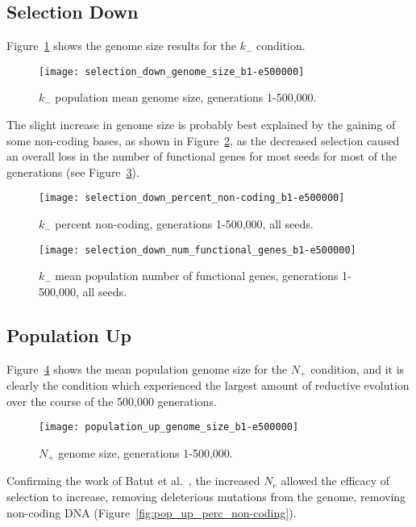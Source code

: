 \subsection{Selection Down}
Figure~\ref{fig:selection_down_genome_size} shows the genome size results for the $k_-$ condition. 
\begin{figure}[H]
	\centering
	\texttt{[image: selection\_down\_genome\_size\_b1-e500000]}
	\caption[Selection down genome size]{$k_-$ population mean genome size, generations 1-500,000.}
	\label{fig:selection_down_genome_size}
\end{figure}
The slight increase in genome size is probably best explained by the gaining of some non-coding bases, as shown in Figure~\ref{fig:selection_down_perc_non-coding}, as the decreased selection caused an overall loss in the number of functional genes for most seeds for most of the generations (see Figure~\ref{fig:selection_down_num_functional_genes}).  
\begin{figure}[h]
	\centering
	\texttt{[image: selection\_down\_percent\_non-coding\_b1-e500000]}
	\caption[Selection down percent non-coding]{$k_-$ percent non-coding, generations 1-500,000, all seeds.}
	\label{fig:selection_down_perc_non-coding}
\end{figure}

\begin{figure}[h]
	\centering
	\texttt{[image: selection\_down\_num\_functional\_genes\_b1-e500000]}
	\caption[Selection down number of functional genes.]{$k_-$ mean population number of functional genes, generations 1-500,000, all seeds.}
	\label{fig:selection_down_num_functional_genes}
\end{figure}


\subsection{Population Up}
Figure~\ref{fig:pop_up_genome_size} shows the mean population genome size for the $N_+$ condition, and it is clearly the condition which experienced the largest amount of reductive evolution over the course of the 500,000 generations. 
\begin{figure}[h]
	\centering
	\texttt{[image: population\_up\_genome\_size\_b1-e500000]}
	\caption[Population up genome size]{$N_+$ genome size, generations 1-500,000.}
	\label{fig:pop_up_genome_size}
\end{figure}

Confirming the work of Batut et al.~\cite{Batut.2014}, the increased $N_e$ allowed the efficacy of selection to increase, removing deleterious mutations from the genome, removing non-coding DNA (Figure~\ref{fig:pop_up_perc_non-coding}). 

